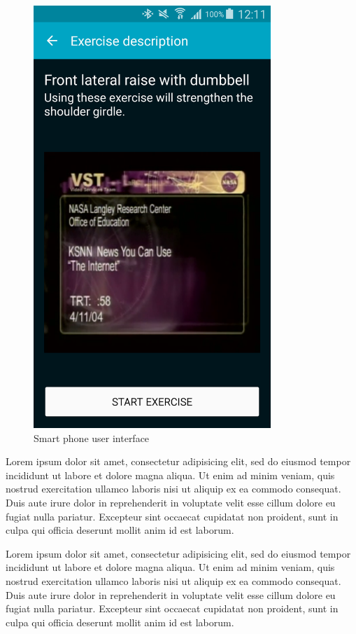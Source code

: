 \begin{figure}[t!]
\begin{minipage}{0.25\textwidth}
        \includegraphics[width=0.80\textwidth]{00_resources/figures/Android_Phone_DescriptionView.png}
    \end{minipage}
  \caption{Smart phone user interface}
  \label{fig:smpui}
\end{figure}

Lorem ipsum dolor sit amet, consectetur adipisicing elit, sed do eiusmod tempor incididunt ut labore et dolore magna aliqua. Ut enim ad minim veniam, quis nostrud exercitation ullamco laboris nisi ut aliquip ex ea commodo consequat. Duis aute irure dolor in reprehenderit in voluptate velit esse cillum dolore eu fugiat nulla pariatur. Excepteur sint occaecat cupidatat non proident, sunt in culpa qui officia deserunt mollit anim id est laborum.

Lorem ipsum dolor sit amet, consectetur adipisicing elit, sed do eiusmod tempor incididunt ut labore et dolore magna aliqua. Ut enim ad minim veniam, quis nostrud exercitation ullamco laboris nisi ut aliquip ex ea commodo consequat. Duis aute irure dolor in reprehenderit in voluptate velit esse cillum dolore eu fugiat nulla pariatur. Excepteur sint occaecat cupidatat non proident, sunt in culpa qui officia deserunt mollit anim id est laborum.

